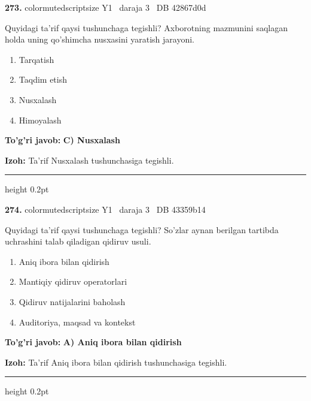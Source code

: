 \documentclass[10pt,a4paper,oneside]{article}
\begin{document}
\noindent\textbf{\color{ink}273.}  {color{muted}scriptsize Y1 \textbullet\ daraja 3 \textbullet\ DB 42867d0d}
\par
Quyidagi ta'rif qaysi tushunchaga tegishli? Axborotning mazmunini saqlagan holda uning qo'shimcha nusxasini yaratish jarayoni.
\begin{enumerate}[label=\Alph*),leftmargin=9mm]
\item Tarqatish
\item Taqdim etish
\item Nusxalash
\item Himoyalash
\end{enumerate}
\begin{tcolorbox}[enhanced,breakable,colback=teal!4,colframe=teal!50!black,boxrule=0.5pt,arc=1.1mm,left=3mm,right=3mm,top=1.7mm,bottom=1.7mm,before skip=2mm,after skip=2mm]
\textbf{\color{teal}To'g'ri javob:} \textbf{C) Nusxalash}
\par\smallskip
\textbf{Izoh:} Ta'rif Nusxalash tushunchasiga tegishli.
\end{tcolorbox}
\vspace{2mm}\hrule height 0.2pt \vspace{3mm}

\noindent\textbf{\color{ink}274.}  {color{muted}scriptsize Y1 \textbullet\ daraja 3 \textbullet\ DB 43359b14}
\par
Quyidagi ta'rif qaysi tushunchaga tegishli? So'zlar aynan berilgan tartibda uchrashini talab qiladigan qidiruv usuli.
\begin{enumerate}[label=\Alph*),leftmargin=9mm]
\item Aniq ibora bilan qidirish
\item Mantiqiy qidiruv operatorlari
\item Qidiruv natijalarini baholash
\item Auditoriya, maqsad va kontekst
\end{enumerate}
\begin{tcolorbox}[enhanced,breakable,colback=teal!4,colframe=teal!50!black,boxrule=0.5pt,arc=1.1mm,left=3mm,right=3mm,top=1.7mm,bottom=1.7mm,before skip=2mm,after skip=2mm]
\textbf{\color{teal}To'g'ri javob:} \textbf{A) Aniq ibora bilan qidirish}
\par\smallskip
\textbf{Izoh:} Ta'rif Aniq ibora bilan qidirish tushunchasiga tegishli.
\end{tcolorbox}
\vspace{2mm}\hrule height 0.2pt \vspace{3mm}
\end{document}
